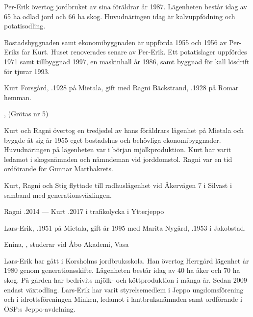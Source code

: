Per-Erik övertog jordbruket av sina föräldrar år 1987. Lägenheten består idag av 65 ha odlad jord och 66 ha skog. Huvudnäringen idag är kalvuppfödning och potatisodling.

Bostadsbyggnaden samt ekonomibyggnaden är uppförda 1955 och 1956 av Per-Eriks far Kurt. Huset renoverades senare av Per-Erik. Ett potatislager uppfördes 1971 samt tillbyggnad 1997, en maskinhall år 1986, samt byggnad för kall lösdrift för tjurar 1993.


%
Kurt Forsgård, .1928 på Mietala, gift med Ragni Bäckstrand, .1928 på Romar hemman.
\begin{jhchildren}
  \item {}, (Grötas nr 5)
  \item {}
\end{jhchildren}

Kurt och Ragni övertog en tredjedel av hans föräldrars lägenhet på Mietala och byggde åt sig år 1955 eget bostadshus och behövliga ekonomibyggnader. Huvudnäringen på lägenheten var i början mjölkproduktion. Kurt har varit ledamot i skogsnämnden och nämndeman vid jorddomstol. Ragni var en tid ordförande för Gunnar Marthakrets.

Kurt, Ragni och Stig flyttade till radhuslägenhet vid Åkervägen 7 i Silvast i samband med generationsväxlingen.

Ragni .2014 --- Kurt .2017 i trafikolycka i Ytterjeppo



%



%
Lars-Erik, .1951 på Mietala, gift år 1995 med Marita Nygård, .1953 i Jakobstad.
\begin{jhchildren}
  \item Enina, , studerar vid Åbo Akademi, Vasa
\end{jhchildren}

Lars-Erik har gått i Korsholms jordbruksskola. Han övertog Herrgård	lägenhet år 1980 genom generationsskifte. Lägenheten består idag av 40 ha åker och 70 ha skog. På gården har bedrivits mjölk- och köttproduktion i många år. Sedan 2009 endast växtodling. Lars-Erik har varit styrelsemedlem i Jeppo ungdomsförening och i idrottsföreningen Minken, ledamot i lantbruksnämnden samt ordförande i ÖSP:s Jeppo-avdelning.

